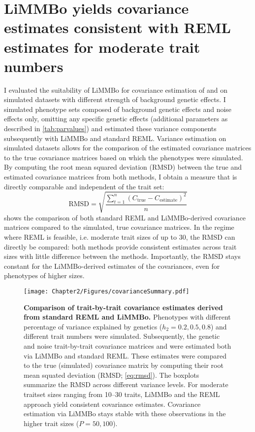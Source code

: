 \section{LiMMBo yields covariance estimates consistent with REML estimates for moderate trait numbers}
\label{section:covariance-limmbo}
I evaluated the suitability of LiMMBo for covariance estimation of  and  on simulated datasets with different strength of background genetic effects. I simulated phenotype sets composed of background genetic effects  and noise effects \tmat{\Psi} only, omitting any specific genetic effects (additional parameters as described in \cref{tab:parvalues}) and estimated these variance components subsequently with LiMMBo and standard REML. Variance estimation on simulated datasets allows for the comparison of the estimated covariance matrices to the true covariance matrices based on which the phenotypes were simulated. By computing the root mean squared deviation (RMSD) between the true and estimated covariance matrices from both methods, I obtain a measure that is directly comparable and independent of the trait set: 
\begin{equation}
\text{RMSD}=\sqrt{\frac{\sum_{t=1}^n (C_{\text{true}} - C_{\text{estimate}})^2}{n}}
\label{eq:rmsd}
\end{equation}
 shows the comparison of both standard REML and LiMMBo-derived covariance matrices compared to the simulated, true covariance matrices. In the regime where REML is feasible, i.e. moderate trait sizes of up to \num{30}, the RMSD can directly be compared: both methods provide consistent estimates across trait sizes with little difference between the methods. Importantly, the RMSD stays constant for the LiMMBo-derived estimates of the covariances, even for phenotypes of higher sizes. 

\begin{figure}[h]
	\centering	
	\texttt{[image: Chapter2/Figures/covarianceSummary.pdf]}\\
	\caption[\textbf{Comparison of trait-by-trait covariance estimates derived from standard REML and LiMMBo.}]{\textbf{Comparison of trait-by-trait covariance estimates derived from standard REML and LiMMBo.} Phenotypes with different percentage of variance explained by genetics (\(h_2={0.2, 0.5, 0.8}\)) and different trait numbers were simulated. Subsequently, the genetic and noise trait-by-trait covariance matrices  and  were estimated both via LiMMBo and standard REML. These estimates were compared to the true (simulated) covariance matrix by computing their root mean squated deviation (RMSD; \cref{eq:rmsd}). The boxplots summarize the RMSD across different variance levels. For moderate traitset sizes ranging from \numrange{10}{30} traits, LiMMBo and the REML approach yield consistent covariance estimates. Covariance estimation via LiMMBo stays stable with these observations in the higher trait sizes (\(P={50,100}\)). }
	  \label{fig:covsimilarity}%
\end{figure}

